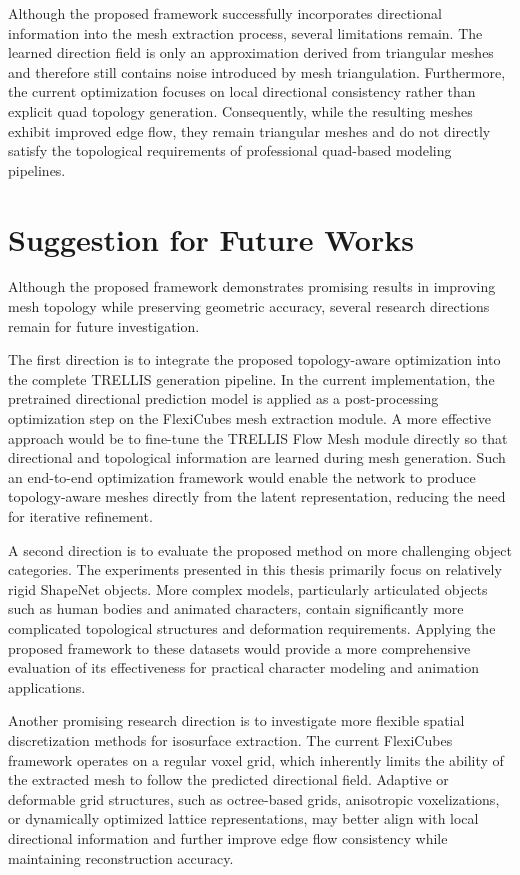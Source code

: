 \documentclass[../main.tex]{subfiles}
\begin{document}
Although the proposed framework successfully incorporates directional information into the mesh extraction process, several limitations remain. The learned direction field is only an approximation derived from triangular meshes and therefore still contains noise introduced by mesh triangulation. Furthermore, the current optimization focuses on local directional consistency rather than explicit quad topology generation. Consequently, while the resulting meshes exhibit improved edge flow, they remain triangular meshes and do not directly satisfy the topological requirements of professional quad-based modeling pipelines.


\section{Suggestion for Future Works}

Although the proposed framework demonstrates promising results in improving mesh topology while preserving geometric accuracy, several research directions remain for future investigation.

The first direction is to integrate the proposed topology-aware optimization into the complete TRELLIS generation pipeline. In the current implementation, the pretrained directional prediction model is applied as a post-processing optimization step on the FlexiCubes mesh extraction module. A more effective approach would be to fine-tune the TRELLIS Flow Mesh module directly so that directional and topological information are learned during mesh generation. Such an end-to-end optimization framework would enable the network to produce topology-aware meshes directly from the latent representation, reducing the need for iterative refinement.

A second direction is to evaluate the proposed method on more challenging object categories. The experiments presented in this thesis primarily focus on relatively rigid ShapeNet objects. More complex models, particularly articulated objects such as human bodies and animated characters, contain significantly more complicated topological structures and deformation requirements. Applying the proposed framework to these datasets would provide a more comprehensive evaluation of its effectiveness for practical character modeling and animation applications.

Another promising research direction is to investigate more flexible spatial discretization methods for isosurface extraction. The current FlexiCubes framework operates on a regular voxel grid, which inherently limits the ability of the extracted mesh to follow the predicted directional field. Adaptive or deformable grid structures, such as octree-based grids, anisotropic voxelizations, or dynamically optimized lattice representations, may better align with local directional information and further improve edge flow consistency while maintaining reconstruction accuracy.
\end{document}
